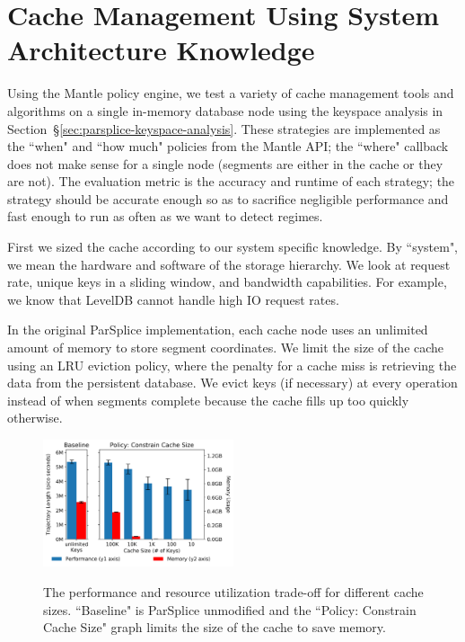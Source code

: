 \section{Cache Management Using System Architecture Knowledge}
\label{sec:cache-management-using-system-archiecture-knowledge}

Using the Mantle policy engine, we test a variety of cache management tools and
algorithms on a single in-memory database node using the keyspace analysis in
Section~\S\ref{sec:parsplice-keyspace-analysis}. These strategies are
implemented as the ``when" and ``how much" policies from the Mantle API; the
``where" callback does not make sense for a single node (segments are either in
the cache or they are not). The evaluation metric is the accuracy and runtime
of each strategy; the strategy should be accurate enough so as to sacrifice
negligible performance and fast enough to run as often as we want to detect
regimes.

First we sized the cache according to our system specific knowledge. By
``system", we mean the hardware and software of the storage hierarchy. We look
at request rate, unique keys in a sliding window, and bandwidth capabilities. For
example, we know that LevelDB cannot handle high IO request rates.

In the original ParSplice implementation, each cache node uses an unlimited
amount of memory to store segment coordinates. We limit the size of the cache
using an LRU eviction policy, where the penalty for a cache miss is retrieving
the data from the persistent database.  We evict keys (if necessary) at every
operation instead of when segments complete because the cache fills up too
quickly otherwise.

\begin{figure}[t]
  \noindent\includegraphics[width=0.5\textwidth]{figures/methodology-tradeoff.png}\\
  \caption{The performance and resource utilization trade-off for different
  cache sizes. ``Baseline" is
  ParSplice unmodified and the ``Policy: Constrain Cache Size" graph limits the
  size of the cache to save memory.  \label{fig:methodology-tradeoff}}
\end{figure}

